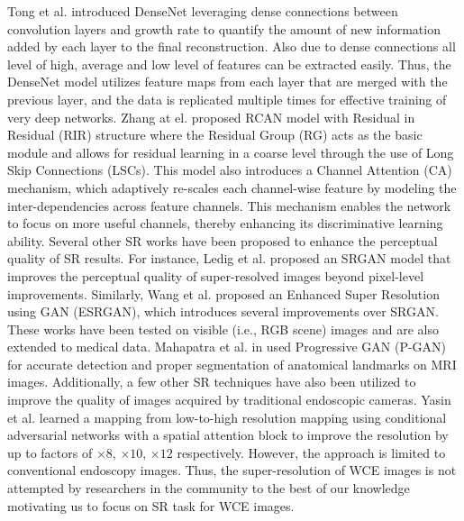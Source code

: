 \documentclass[conference]{IEEEtran}
\begin{document}
Tong et al. introduced DenseNet \cite{SRDensenet} leveraging dense connections between convolution layers and growth rate to quantify the amount of new information added by each layer to the final reconstruction. Also due to dense connections all level of high, average and low level of features can be extracted easily. Thus, the DenseNet model utilizes feature maps from each layer that are merged with the previous layer, and the data is replicated multiple times for effective training of very deep networks. Zhang at el. proposed RCAN \cite{RCAN} model with Residual in Residual (RIR) structure where the Residual Group (RG) acts as the basic module and allows for residual learning in a coarse level through the use of Long Skip Connections (LSCs). This model also introduces a Channel Attention (CA) mechanism, which adaptively re-scales each channel-wise feature by modeling the inter-dependencies across feature channels. This mechanism enables the network to focus on more useful channels, thereby enhancing its discriminative learning ability. Several other SR works have been proposed to enhance the perceptual quality of SR results. For instance, Ledig et al. \cite{SRGAN} proposed an SRGAN model that improves the perceptual quality of super-resolved images beyond pixel-level improvements. Similarly, Wang et al. \cite{ESRGAN} proposed an Enhanced Super Resolution using GAN (ESRGAN), which introduces several improvements over SRGAN. These works have been tested on visible (i.e., RGB scene) images and are also extended to medical data. Mahapatra et al. in \cite{L10} used Progressive GAN (P-GAN) for accurate detection and proper segmentation of anatomical landmarks on MRI images. Additionally, a few other SR techniques have also been utilized to improve the quality of images acquired by traditional endoscopic cameras. Yasin et al. \cite{EndoL2H} learned a mapping from low-to-high resolution mapping using conditional adversarial networks with a spatial attention block to improve the resolution by up to factors of $\times 8$, $\times 10$, $\times 12$ respectively. However, the approach is limited to conventional endoscopy images. Thus, the super-resolution of WCE images is not attempted by researchers in the community to the best of our knowledge motivating us to focus on SR task for WCE images.
\end{document}
